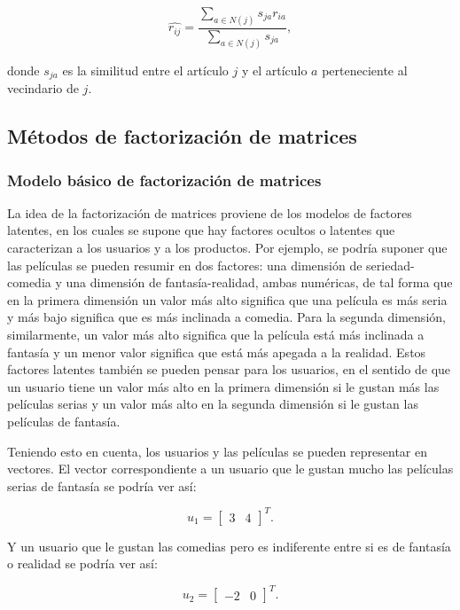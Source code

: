\begin{equation}\label{predic_modelo_articulo_ponderado}
 \hat{r_{ij}} = \frac{\sum_{a \in N(j)} s_{ja} r_{ia}}{\sum_{a \in N(j)} s_{ja}},
\end{equation}

donde $s_{ja}$ es la similitud entre el artículo $j$ y el artículo $a$ perteneciente al vecindario de $j$.

\subsection{Métodos de factorización de matrices}

\subsubsection{Modelo básico de factorización de matrices}

La idea de la factorización de matrices proviene de los modelos de factores latentes, en los cuales se supone que hay factores ocultos o latentes que caracterizan a los usuarios y a los productos. Por ejemplo, se podría suponer que las películas se pueden resumir en dos factores: una dimensión de seriedad-comedia y una dimensión de fantasía-realidad, ambas numéricas, de tal forma que en la primera dimensión un valor más alto significa que una película es más seria y más bajo significa que es más inclinada a comedia. Para la segunda dimensión, similarmente, un valor más alto significa que la película está más inclinada a fantasía y un menor valor significa que está más apegada a la realidad. Estos factores latentes también se pueden pensar para los usuarios, en el sentido de que un usuario tiene un valor más alto en la primera dimensión si le gustan más las películas serias y un valor más alto en la segunda dimensión si le gustan las películas de fantasía.

Teniendo esto en cuenta, los usuarios y las películas se pueden representar en vectores. El vector correspondiente a un usuario que le gustan mucho las películas serias de fantasía se podría ver así:

\[
     u_1 = 
    \begin{bmatrix}
        3 & 4
    \end{bmatrix}^{T}.
\]
  
Y un usuario que le gustan las comedias pero es indiferente entre si es de fantasía o realidad se podría ver así:

\[
     u_2 = 
     \begin{bmatrix}
         -2 & 0
    \end{bmatrix}^{T}.
\]
  
